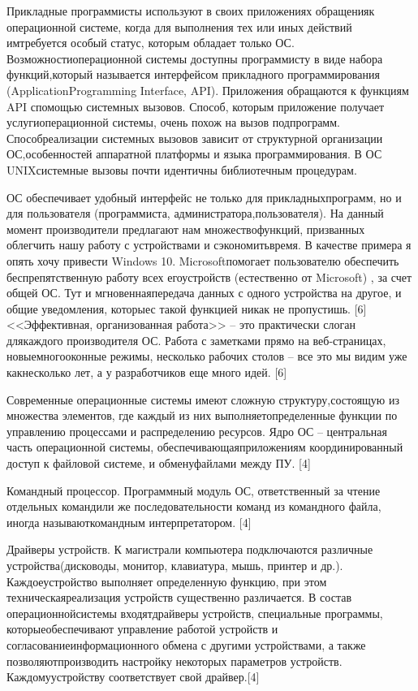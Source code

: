 Прикладные программисты используют в своих приложениях обращенияк операционной системе, когда для выполнения тех или иных действий имтребуется   особый   статус,   которым   обладает   только   ОС.   Возможностиоперационной   системы   доступны   программисту   в   виде   набора   функций,который называется интерфейсом прикладного программирования (ApplicationProgramming   Interface,  API).   Приложения   обращаются   к   функциям   API   спомощью системных вызовов. Способ, которым приложение получает услугиоперационной   системы,   очень   похож   на   вызов   подпрограмм.   Способреализации   системных   вызовов   зависит   от   структурной   организации   ОС,особенностей аппаратной платформы и языка программирования. В ОС UNIXсистемные вызовы почти идентичны библиотечным процедурам.~\cite{Oc1}

ОС   обеспечивает   удобный   интерфейс   не   только   для   прикладныхпрограмм,   но   и   для   пользователя   (программиста,   администратора,пользователя). На данный момент производители предлагают нам множествофункций, призванных облегчить нашу работу с устройствами и сэкономитьвремя. В качестве примера я опять хочу привести  Windows  10.  Microsoftпомогает   пользователю   обеспечить   беспрепятственную   работу   всех   егоустройств (естественно от  Microsoft) , за счет общей ОС. Тут и мгновеннаяпередача данных с одного устройства на другое, и общие уведомления, которыес такой функцией никак не пропустишь. [6]<<Эффективная, организованная работа>>  – это практически слоган длякаждого производителя ОС. Работа с заметками прямо на веб-страницах, новыемногооконные режимы, несколько рабочих столов – все это мы видим уже какнесколько лет, а у разработчиков еще много идей. [6]

Современные   операционные   системы   имеют   сложную   структуру,состоящую   из   множества   элементов,   где   каждый   из   них   выполняетопределенные функции по управлению процессами и распределению ресурсов.
Ядро ОС – центральная часть операционной системы, обеспечивающаяприложениям   координированный   доступ   к   файловой   системе,   и   обменуфайлами между ПУ. [4]

Командный процессор. Программный модуль ОС, ответственный за чтение отдельных командили же последовательности команд из командного файла, иногда называюткомандным интерпретатором. [4]

Драйверы устройств. К магистрали  компьютера подключаются различные устройства(дисководы,   монитор,   клавиатура,   мышь,   принтер   и   др.).   Каждоеустройство выполняет определенную функцию, при этом техническаяреализация устройств существенно различается. В состав операционнойсистемы входятдрайверы устройств, специальные программы, которыеобеспечивают   управление   работой   устройств   и   согласованиеинформационного обмена с другими устройствами, а также позволяютпроизводить   настройку   некоторых   параметров   устройств.   Каждомуустройству соответствует свой драйвер.[4]

